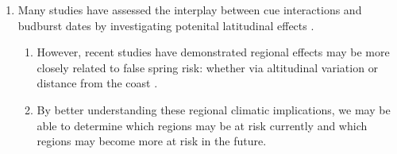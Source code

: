 \documentclass{article}\usepackage[]{graphicx}\usepackage[]{color}
\begin{document}
\begin{enumerate}
\item Many studies have assessed the interplay between cue interactions and budburst dates by investigating potenital latitudinal effects \citep{Partanen2004, Viheraaarnio2006, Caffarra2011, Zohner2016, Gauzere2017}.
\begin{enumerate}
\item However, recent studies have demonstrated regional effects may be more closely related to false spring risk: whether via altitudinal variation \citep{Vitra2017} or distance from the coast \citep{Wypych2016a}.
\item By better understanding these regional climatic implications, we may be able to determine which regions may be at risk currently and which regions may become more at risk in the future.
\end{enumerate}


\end{enumerate}
\end{document}
